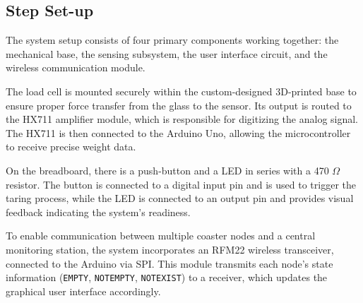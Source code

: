 \subsection{Step Set-up}
The system setup consists of four primary components working together: the mechanical base, the sensing subsystem, the user interface circuit, and the wireless communication module.

The load cell is mounted securely within the custom-designed 3D-printed base to ensure proper force transfer from the glass to the sensor. Its output is routed to the HX711 amplifier module, which is responsible for digitizing the analog signal. The HX711 is then connected to the Arduino Uno, allowing the microcontroller to receive precise weight data.

On the breadboard, there is a push-button and a LED in series with a 470 $\Omega$ resistor. The button is connected to a digital input pin and is used to trigger the taring process, while the LED is connected to an output pin and provides visual feedback indicating the system’s readiness.

To enable communication between multiple coaster nodes and a central monitoring station, the system incorporates an RFM22 wireless transceiver, connected to the Arduino via SPI. This module transmits each node’s state information (\texttt{EMPTY}, \texttt{NOTEMPTY}, \texttt{NOTEXIST}) to a receiver, which updates the graphical user interface accordingly.

